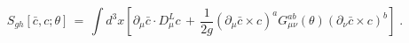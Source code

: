 \begin{equation}\label{eq:defsgh}
S_{gh}[{\bar c},c;\theta]\,=\, \int d^3x \left[
\partial_\mu {\bar c} \cdot D_\mu^L c \,+\,
\frac{1}{2g} (\partial_\mu {\bar c} \times c)^a 
G_{\mu\nu}^{ab}(\theta)  (\partial_\nu{\bar c}\times c)^b \right]\;.
\end{equation}

